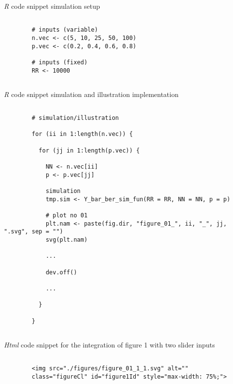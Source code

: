 \documentclass[12pt]{article}
\begin{document}
\begin{CodeSnippet}[!hp]
	\centering
	\caption{\emph{R} code snippet simulation setup}
	\footnotesize
	\vspace{0.25cm}
	\begin{BVerbatim}
		
		# inputs (variable)
		n.vec <- c(5, 10, 25, 50, 100)
		p.vec <- c(0.2, 0.4, 0.6, 0.8)
		
		# inputs (fixed)
		RR <- 10000
		
	\end{BVerbatim}
	\label{RCodSniSimSet}
\end{CodeSnippet}

\begin{CodeSnippet}[!hp]
	\centering
	\caption{\emph{R} code snippet simulation and illustration implementation}
	\footnotesize
	\vspace{0.25cm}
	\begin{BVerbatim}
		
		# simulation/illustration
		
		for (ii in 1:length(n.vec)) {
			
		  for (jj in 1:length(p.vec)) {
				
		    NN <- n.vec[ii]
			p <- p.vec[jj]
				
			simulation
			tmp.sim <- Y_bar_ber_sim_fun(RR = RR, NN = NN, p = p)
				
			# plot no 01
			plt.nam <- paste(fig.dir, "figure_01_", ii, "_", jj, ".svg", sep = "")
			svg(plt.nam) 
				
			...
				
			dev.off()		
				
			...
				
		  }
			
		}
		
	\end{BVerbatim}
	\label{RCodSniSimImp}
\end{CodeSnippet}

\begin{CodeSnippet}[!hp]
	\centering
	\caption{\emph{Html} code snippet for the integration of figure 1 with two slider inputs}
	\footnotesize
	\vspace{0.25cm}
	\begin{BVerbatim}
		
		<img src="./figures/figure_01_1_1.svg" alt=""
		class="figureCl" id="figure1Id" style="max-width: 75%
		
	\end{BVerbatim}
	\label{HtmlCodSniImgTag}
\end{CodeSnippet}
\end{document}
